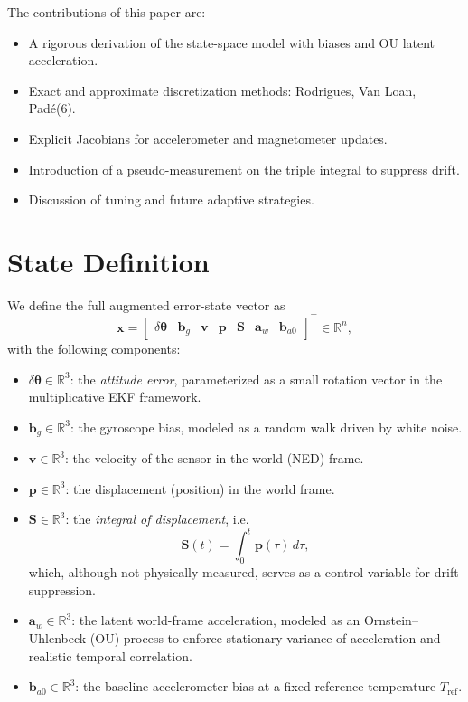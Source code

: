 \documentclass[10pt]{extarticle}
\begin{document}
The contributions of this paper are:
\begin{itemize}
\item A rigorous derivation of the state-space model with biases and OU latent acceleration.
\item Exact and approximate discretization methods: Rodrigues, Van Loan, Pad\'e(6).
\item Explicit Jacobians for accelerometer and magnetometer updates.
\item Introduction of a pseudo-measurement on the triple integral to suppress drift.
\item Discussion of tuning and future adaptive strategies.
\end{itemize}

\section{State Definition}

We define the full augmented error-state vector as
\begin{equation}
\bm{x} =
\begin{bmatrix}
\delta\bm\theta & \bm b_g & \bm v & \bm p & \bm S & \bm a_w & \bm b_{a0}
\end{bmatrix}^\top \in \mathbb{R}^n,
\label{eq:state_vector}
\end{equation}
with the following components:
\begin{itemize}
\item $\delta\bm\theta \in \mathbb{R}^3$: the \emph{attitude error}, parameterized as a small rotation vector in the multiplicative EKF framework.
\item $\bm b_g \in \mathbb{R}^3$: the gyroscope bias, modeled as a random walk driven by white noise.
\item $\bm v \in \mathbb{R}^3$: the velocity of the sensor in the world (NED) frame.
\item $\bm p \in \mathbb{R}^3$: the displacement (position) in the world frame.
\item $\bm S \in \mathbb{R}^3$: the \emph{integral of displacement}, i.e.
  \[
  \bm S(t) = \int_0^t \bm p(\tau)\, d\tau,
  \]
  which, although not physically measured, serves as a control variable for drift suppression.
\item $\bm a_w \in \mathbb{R}^3$: the latent world-frame acceleration, modeled as an Ornstein--Uhlenbeck (OU) process to enforce stationary variance of acceleration and realistic temporal correlation.
\item $\bm b_{a0} \in \mathbb{R}^3$: the baseline accelerometer bias at a fixed reference temperature $T_\text{ref}$.
\end{itemize}
\end{document}
